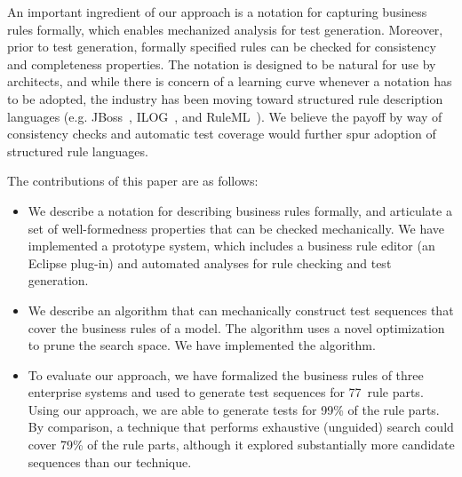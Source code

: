 
An important ingredient of our approach is a notation for capturing business
rules formally, which enables mechanized analysis for test generation. Moreover,
prior to test generation, formally specified rules can be checked for
consistency and completeness properties.  The notation is designed to be natural
for use by architects, and while there is concern of a learning curve whenever a
notation has to be adopted, the industry has been moving toward
structured rule description languages (e.g. JBoss~\cite{JBoss},
ILOG~\cite{ILog}, and RuleML~\cite{RuleML}).  We believe the payoff by way of
consistency checks and automatic test coverage would further spur adoption of
structured rule languages.
 

The contributions of this paper are as follows:
\begin{itemize}[noitemsep]
\item We describe a notation for describing business rules formally, and articulate
  a set of well-formedness properties that can be checked mechanically. We have implemented a prototype system, 
	which includes a business rule editor (an Eclipse plug-in) and automated analyses for rule checking and test generation.
\item We describe an algorithm that can mechanically construct test sequences
  that cover the business rules of a model. The algorithm uses a
  novel optimization to prune the search space. We have implemented
  the algorithm. %
\item To evaluate our approach, we have formalized the business rules
  of three enterprise systems and used \tool{} to generate test
  sequences for 77~rule parts. Using our approach, we are able to generate tests for 99\%
  of the rule parts. By comparison, a technique that performs exhaustive (unguided) search
could cover 79\% of the rule parts, although it explored substantially more
candidate sequences than our technique.
\end{itemize}

